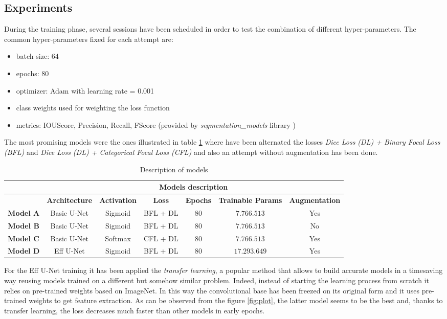 \documentclass[a4paper,10pt]{report}
\begin{document}
\subsection{Experiments}\label{subsec:subsection-422}
During the training phase, several sessions have been scheduled in order to test the combination of different hyper-parameters.
The common hyper-parameters fixed for each attempt are:
\begin{itemize}
    \item batch size: 64
    \item epochs: 80
    \item optimizer: Adam with learning rate = 0.001
    \item class weights used for weighting the loss function
    \item metrics: IOUScore, Precision, Recall, FScore (provided by \emph{segmentation_models} library \cite{segmentation-models})
\end{itemize}

The most promising models were the ones illustrated in table \ref{table:models} where have been alternated the losses \textit{Dice Loss (DL) +  Binary Focal Loss (BFL)} and \textit{Dice Loss (DL) +  Categorical Focal Loss (CFL)} and also an attempt without augmentation has been done.

\begin{table}[h]
\center
  \begin{tabular}{|c|c|c|c|c|c|c|}
  \hline
    \multirow{2}{*}{} & \multicolumn{6}{c|}{\textbf{Models description}}  \\ \hline 
                        & \textbf{Architecture} & \textbf{Activation} & \textbf{Loss}& \textbf{Epochs} & \textbf{Trainable Params} & \textbf{Augmentation} \\ \hline
    \textbf{Model A}   & Basic U-Net & Sigmoid & BFL + DL & $80$ & $7.766.513$ & Yes \\ \hline
    \textbf{Model B}      & Basic U-Net & Sigmoid & BFL + DL & $80$ & $7.766.513$ & No \\ \hline
    \textbf{Model C}       & Basic U-Net & Softmax & CFL + DL & $80$ & $7.766.513$ & Yes  \\ \hline
    \textbf{Model D} & Eff U-Net & Sigmoid & BFL + DL & $80$ & $17.293.649$ & Yes \\ \hline
  \end{tabular}
  \caption{Description of models}
  \label{table:models}
\end{table}


For the Eff U-Net training it has been applied the \textit{transfer learning}, a popular method that allows to build accurate models in a timesaving way reusing models trained on a different but somehow similar problem.
Indeed, instead of starting the learning process from scratch it relies on pre-trained weights based on ImageNet. In this way the convolutional base has been freezed on its original form and it uses pre-trained weights to get feature extraction.
As can be observed from the figure \ref{fig:plot}, the latter model seems to be the best and, thanks to transfer learning, the loss decreases much faster than other models in early epochs.
\end{document}
